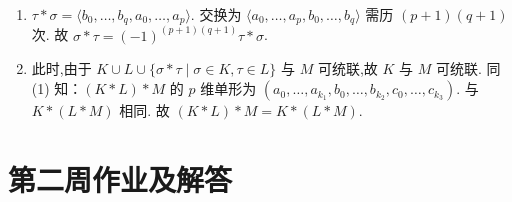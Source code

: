 \begin{enumerate}
\begin{proofc}[解答]
\begin{enumerate}[label=(\arabic*)]
    \item $\tau * \sigma = \langle b_0, \dots, b_q, a_0, \dots, a_p \rangle$.
    交换为 $\langle a_0, \dots, a_p, b_0, \dots, b_q \rangle$ 需历 $(p+1)(q+1)$ 次.
    故 $\sigma * \tau = (-1)^{(p+1)(q+1)} \tau * \sigma$.

    \item 此时,由于 $K \cup L \cup \{\sigma * \tau \mid \sigma \in K, \tau \in L\}$ 与 $M$ 可统联,故 $K$ 与 $M$ 可统联.
    同 (1) 知：$(K*L)*M$ 的 $p$ 维单形为 $(a_0, \dots, a_{k_1}, b_0, \dots, b_{k_2}, c_0, \dots, c_{k_3})$.
    与 $K*(L*M)$ 相同.
    故 $(K*L)*M = K*(L*M)$.\qedhere
\end{enumerate}
\end{proofc}
\end{enumerate}

\section{第二周作业及解答}
